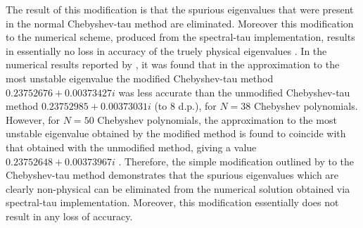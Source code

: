 \documentclass[a4paper, 12pt, twoside, openright]{article}
\numberwithin{equation}{section}
\begin{document}
The result of this modification is that the spurious eigenvalues that were present in the normal Chebyshev-tau method are eliminated. Moreover this modification to the numerical scheme, produced from the spectral-tau implementation, results in essentially no loss in accuracy of the truely physical eigenvalues \citep{Mcfadden90}. In the numerical results reported by \cite{Mcfadden90}, it was found that in the approximation to the most unstable eigenvalue the modified Chebyshev-tau method $0.23752676+0.00373427i$ was less accurate than the unmodified Chebyshev-tau method $0.23752985+0.00373031i$ (to 8 d.p.), for $N=38$ Chebyshev polynomials. However, for $N=50$ Chebyshev polynomials, the approximation to the most unstable eigenvalue obtained by the modified method is found to coincide with that obtained with the unmodified method, giving a value $0.23752648+0.00373967i$ \citep{Mcfadden90}. Therefore, the simple modification outlined by \cite{Mcfadden90} to the Chebyshev-tau method demonstrates that the spurious eigenvalues which are clearly non-physical can be eliminated from the numerical solution obtained via spectral-tau implementation. Moreover, this modification essentially does not result in any loss of accuracy. 
\end{document}

